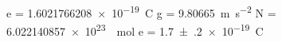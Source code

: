 e = \SI[]{1.6021766208e-19}{\coulomb}
g = \SI[]{9.80665}{\meter\per\second\squared}
N = \SI[]{6.022140857e+23}{\per\mole}
e = \SI{+1.7(2)e-19}{\coulomb}
